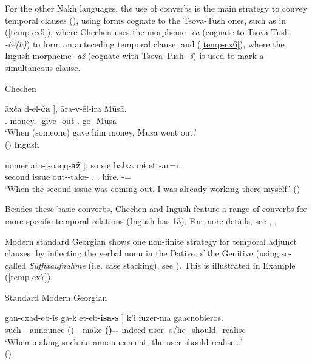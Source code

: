 \begin{enumerate}[label=\Roman*.]
For the other Nakh languages, the use of converbs is the main strategy to convey temporal clauses (\cite{nichols11,nichols94Che}), using forms cognate to the Tsova-Tush ones, such as in (\ref{temp-ex5}), where Chechen uses the morpheme \textit{-ča} (cognate to Tsova-Tush \textit{-če(ħ)}) to form an anteceding temporal clause, and (\ref{temp-ex6}), where the Ingush morpheme \textit{-až} (cognate with Tsova-Tush \textit{-š}) is used to mark a simultaneous clause.


	\begin{exe}
		\ex\label{temp-ex5}
		Chechen
        
		\gll {{\normalfont[} šiena}	\={a}xča	{d-el-\textbf{ča} {\normalfont]}},	\={a}ra-v-\={e}l-ira	M\={u}s\={a}.    \\
		{\Refl}.{\Dat}	money.{\Nom}	{\D}-give-\textbf{{\Ante}}	out-{\M}.{\Sg}-go-{\Aor}	Musa	\\
		\trans `When (someone) gave him money, Musa went out.' \\
		\hfill (\cite[64]{nichols94Che})
		\ex\label{temp-ex6}
		Ingush
        
		\gll {{\normalfont[} šolla\u{g}}	nomer	{\={a}ra-j-oaqq-\textbf{až} {\normalfont]}},	so	sie	balxa	mɨ	ett-ar=\={\i}.    \\
		second	issue	out-{\J}-take-\textbf{{\Simul}}	{\Fsg}.{\Nom}	{\Fsg}.{\Refl}	hire.{\Adv}	{\Emph}	{\Lv}-{\Pst}={\Q}	\\
		\trans `When the second issue was coming out, I was already working there myself.’
		\hfill (\cite[602]{nichols11})
	\end{exe}


Besides these basic converbs, Chechen and Ingush feature a range of converbs for more specific temporal relations (Ingush has 13). For more details, see \textcite{nichols94Che,nichols11}, \textcite{good}. 


Modern standard Georgian shows one non-finite strategy for temporal adjunct clauses, by inflecting the verbal noun in the Dative of the Genitive (using so-called \textit{Suffixaufnahme} (i.e. case stacking), see \cite{boeder95}). This is illustrated in Example (\ref{temp-ex7}).


	\begin{exe}
		\ex\label{temp-ex7}
		Standard Modern Georgian
        
		\gll {{\normalfont[} aset-i}	gan-cxad-eb-is	{ga-k'et-eb-\textbf{isa-s} {\normalfont]}}	k'i  iuzer-ma	gaacnobieros.    \\
		such-{\Agr}	{\Pv}-announce-{\Tm}({\Vn})-{\Gen}	{\Pv}-make-{\Tm}\textbf{({\Vn})-{\Gen}-{\Dat}}	indeed	user-{\Erg}	s/he\_should\_realise	\\
		\trans `When making such an announcement, the user should realise…’ \\
		\hfill (\cite[55]{wier})
	\end{exe}



\end{enumerate}
